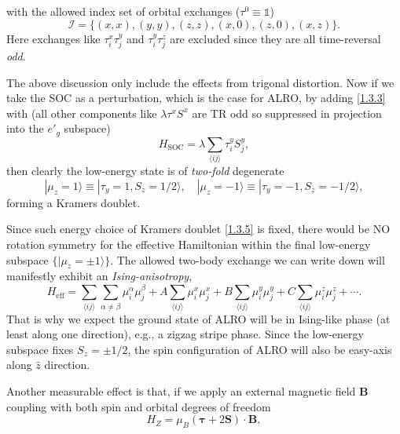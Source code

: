 \documentclass[10pt,nofootinbib,letterpaper]{revtex4}
\begin{document}
		with the allowed index set of orbital exchanges ($\tau^0\equiv\mathds{1}$)
		\begin{equation*}
			\mathcal{I}=\{(x,x),(y,y),(z,z),(x,0),(z,0),(x,z)\}.
		\end{equation*}
		Here exchanges like $\tau^x_i\tau^y_j$ and $\tau^y_i\tau^z_j$ are excluded since they are all time-reversal \emph{odd}.\par
		The above discussion only include the effects from trigonal distortion. Now if we take the SOC as a perturbation, which is the case for ALRO, by adding \eqref{1.3.3} with (all other components like $\lambda\tau^xS^x$ are TR odd so suppressed in projection into the $e'_g$ subspace)
		\begin{equation}\label{1.3.4}
			H_{\text{SOC}}=\lambda\sum_{\langle ij \rangle}\tau^y_iS^y_j,
		\end{equation}
		then clearly the low-energy state is of \emph{two-fold} degenerate
		\begin{equation}\label{1.3.5}
			|\mu_z=1\rangle\equiv|\tau_y=1,S_z=1/2\rangle,\quad |\mu_z=-1\rangle\equiv|\tau_y=-1,S_z=-1/2\rangle,
		\end{equation}
		forming a Kramers doublet.\par
		Since such energy choice of Kramers doublet \eqref{1.3.5} is fixed, there would be NO rotation symmetry for the effective Hamiltonian within the final low-energy subspace $\{|\mu_z=\pm1\rangle\}$. The allowed two-body exchange we can write down will manifestly exhibit an \emph{Ising-anisotropy},
		\begin{equation}\label{1.3.6}
		 	H_{\text{eff}}=\sum_{\langle ij \rangle }\sum_{\alpha\neq\beta}\mu^\alpha_i\mu^\beta_j+A\sum_{\langle ij \rangle}\mu_i^x\mu_j^x+B\sum_{\langle ij \rangle}\mu_i^y\mu_j^y+C\sum_{\langle ij \rangle}\mu_i^z\mu_j^z+\cdots.
		\end{equation}
		That is why we expect the ground state of ALRO will be in Ising-like phase (at least along one direction), e.g., a zigzag stripe phase. Since the low-energy subspace fixes $S_z=\pm1/2$, the spin configuration of ALRO will also be easy-axis along $\hat{z}$ direction.\par
		Another measurable effect is that, if we apply an external magnetic field $\bm{B}$ coupling with both spin and orbital degrees of freedom
		\begin{equation}\label{1.3.7}
			H_{Z}=\mu_B(\bm{\tau}+2\bm{S})\cdot\bm{B},
		\end{equation}
\end{document}
